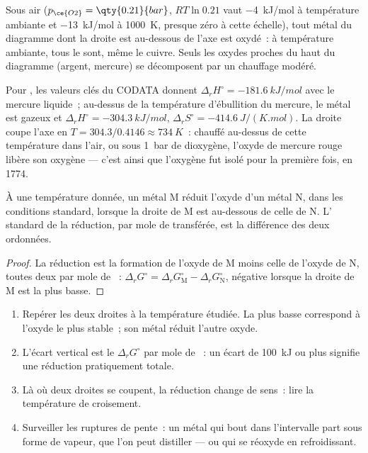 Sous air ($p_{\ce{O2}} = \qty{0.21}{bar}$, $RT\ln 0.21$ vaut \qty{-4}{kJ/mol}
à température ambiante et \qty{-13}{kJ/mol} à \qty{1000}{K}, presque zéro à cette
échelle), tout métal du diagramme dont la droite
est au-dessous de l'axe est oxydé~: à température ambiante, tous le sont, même le cuivre.
Seuls les oxydes proches du haut du diagramme (argent, mercure) se décomposent par un chauffage
modéré.

\begin{example}\label{ex:b2:ellingham:hgo}
Pour , les valeurs clés du CODATA donnent $\Delta_r H^\circ =
\qty{-181.6}{kJ/mol}$ avec le mercure liquide~; au-dessus de la température d'ébullition du mercure,
le métal est gazeux et $\Delta_r H^\circ = \qty{-304.3}{kJ/mol}$, $\Delta_r
S^\circ = \qty{-414.6}{J/(K.mol)}$. La droite coupe l'axe en
$T = 304.3/0.4146 \approx \qty{734}{K}$~: chauffé au-dessus de cette température dans l'air,
ou sous \qty{1}{bar} de dioxygène, l'oxyde de mercure rouge libère son oxygène ---
c'est ainsi que l'oxygène fut isolé pour la première fois, en 1774.
\end{example}

\begin{proposition}\label{prop:b2:ellingham:reduction}
À une température donnée, un métal M réduit l'oxyde d'un métal N, dans les
conditions standard, lorsque la droite de M est au-dessous de celle de N. L' standard de la réduction, par mole de  transférée, est la
différence des deux ordonnées.
\end{proposition}

\begin{proof}
La réduction est la formation de l'oxyde de M moins celle de l'oxyde de N, toutes deux par
mole de ~: $\Delta_r G^\circ = \Delta_r G^\circ_{\mathrm M} - \Delta_r
G^\circ_{\mathrm N}$, négative lorsque la droite de M est la plus basse.
\end{proof}

\begin{method}\label{met:b2:ellingham:read-ellingham}
\begin{enumerate}
  \item Repérer les deux droites à la température étudiée. La plus basse correspond à
        l'oxyde le plus stable~; son métal réduit l'autre oxyde.
  \item L'écart vertical est le $\Delta_r G^\circ$ par mole de ~: un écart de
        \qty{100}{kJ} ou plus signifie une réduction pratiquement totale.
  \item Là où deux droites se coupent, la réduction change de sens~: lire la
        température de croisement.
  \item Surveiller les ruptures de pente~: un métal qui bout dans l'intervalle part sous forme de
        vapeur, que l'on peut distiller --- ou qui se réoxyde en refroidissant.
\end{enumerate}
\end{method}

